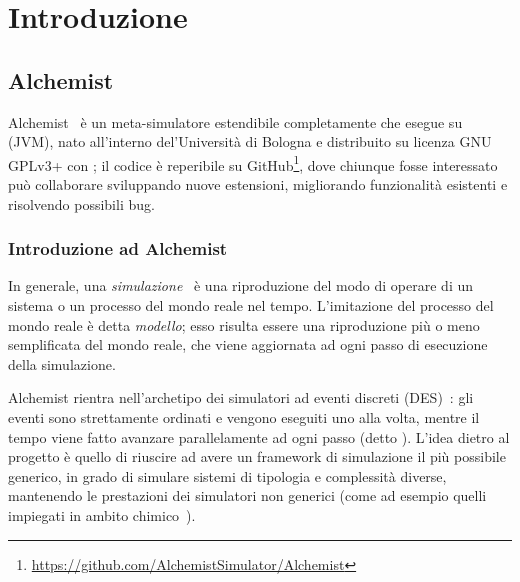 

\chapter{Introduzione}\label{ch:intro}

    \section{Alchemist}\label{sec:alchemist}
        Alchemist~\cite{alchemistWeb, alchemist2013} è un meta-simulatore estendibile completamente  che esegue su  (JVM), nato all'interno del'Università di Bologna e distribuito su licenza GNU GPLv3+ con ; il codice è reperibile su GitHub\footnote{\url{https://github.com/AlchemistSimulator/Alchemist}}\label{fn:gh}, dove chiunque fosse interessato può collaborare sviluppando nuove estensioni, migliorando funzionalità esistenti e risolvendo possibili bug.

        \subsection{Introduzione ad Alchemist}\label{sub:introAlchemist}
            In generale, una \emph{simulazione}~\cite{des3} è una riproduzione del modo di operare di un sistema o un processo del mondo reale nel tempo.
            L'imitazione del processo del mondo reale è detta \emph{modello}; esso risulta essere una riproduzione più o meno semplificata del mondo reale, che viene aggiornata ad ogni passo di esecuzione della simulazione.

            Alchemist rientra nell'archetipo dei simulatori ad eventi discreti (DES)~\cite{des, des2}: gli eventi sono strettamente ordinati e vengono eseguiti uno alla volta, mentre il tempo viene fatto avanzare parallelamente ad ogni passo (detto ).
            L'idea dietro al progetto è quello di riuscire ad avere un framework di simulazione il più possibile generico, in grado di simulare sistemi di tipologia e complessità diverse, mantenendo le prestazioni dei simulatori non generici (come ad esempio quelli impiegati in ambito chimico~\cite{gillespie1976}).

